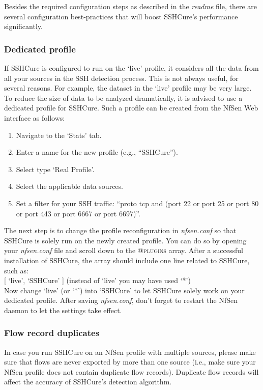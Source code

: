 Besides the required configuration steps as described in the \textit{readme} file, there are several configuration best-practices that will boost SSHCure's performance significantly.

\subsubsection{Dedicated profile}

If SSHCure is configured to run on the `live' profile, it considers all the data from all your sources in the SSH detection process. This is not always useful, for several reasons. For example, the dataset in the `live' profile may be very large. To reduce the size of data to be analyzed dramatically, it is advised to use a dedicated profile for SSHCure. Such a profile can be created from the NfSen Web interface as follows:

\begin{enumerate}
	\item Navigate to the `Stats' tab.
	\item Enter a name for the new profile (e.g., ``SSHCure'').
	\item Select type `Real Profile'.
	\item Select the applicable data sources.
	\item Set a filter for your SSH traffic: ``proto tcp and (port 22 or port 25 or port 80 or port 443 or port 6667 or port 6697)''.
\end{enumerate}

The next step is to change the profile reconfiguration in \textit{nfsen.conf} so that SSHCure is solely run on the newly created profile. You can do so by opening your \textit{nfsen.conf} file and scroll down to the \textsc{@plugins} array. After a successful installation of SSHCure, the array should include one line related to SSHCure, such as: \\ 

[ `live', `SSHCure' ] \hfill (instead of `live' you may have used `*') \\

Now change `live' (or `*') into `SSHCure' to let SSHCure solely work on your dedicated profile. After saving \textit{nfsen.conf}, don't forget to restart the NfSen daemon to let the settings take effect.

\subsubsection{Flow record duplicates}

In case you run SSHCure on an NfSen profile with multiple sources, please make sure that flows are never exported by more than one source (i.e., make sure your NfSen profile does not contain duplicate flow records). Duplicate flow records will affect the accuracy of SSHCure's detection algorithm.

